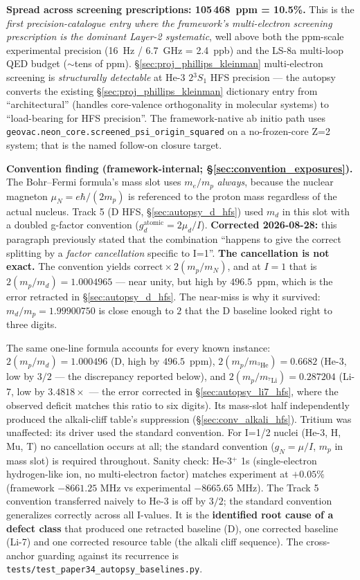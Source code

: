 \documentclass[11pt]{article}
\begin{document}
\textbf{Spread across screening prescriptions: 105\,468~ppm = 10.5\%.}
This is the \emph{first precision-catalogue entry where the framework's
multi-electron screening prescription is the dominant Layer-2
systematic}, well above both the ppm-scale experimental precision
(16~Hz / 6.7~GHz = 2.4~ppb) and the LS-8a multi-loop QED budget
($\sim$tens of ppm). \S\ref{sec:proj_phillips_kleinman} multi-electron
screening is \emph{structurally detectable} at He-3 $2{}^3\!S_1$ HFS
precision --- the autopsy converts the existing
\S\ref{sec:proj_phillips_kleinman} dictionary entry from
``architectural'' (handles core-valence orthogonality in molecular
systems) to ``load-bearing for HFS precision''. The framework-native
ab initio path uses
\texttt{geovac.neon\_core.screened\_psi\_origin\_squared} on a
no-frozen-core Z=2 system; that is the named follow-on closure target.

\textbf{Convention finding (framework-internal; \S\ref{sec:convention_exposures}).}
The Bohr--Fermi formula's mass slot uses $m_e/m_p$ \emph{always},
because the nuclear magneton $\mu_N = e\hbar/(2 m_p)$ is referenced
to the proton mass regardless of the actual nucleus. Track 5 (D HFS,
\S\ref{sec:autopsy_d_hfs}) used $m_d$ in this slot with a doubled
g-factor convention ($g_d^\text{atomic} = 2\mu_d/I$).  \textbf{Corrected
2026-08-28:} this paragraph previously stated that the combination
``happens to give the correct splitting by a \emph{factor cancellation}
specific to I=1''.  \textbf{The cancellation is not exact.}  The
convention yields $\text{correct} \times 2(m_p/m_N)$, and at $I=1$ that
is $2(m_p/m_d) = 1.0004965$ --- near unity, but high by $496.5$~ppm,
which is the error retracted in \S\ref{sec:autopsy_d_hfs}.  The near-miss
is why it survived: $m_d/m_p = 1.99900750$ is close enough to $2$ that
the D baseline looked right to three digits.

The same one-line formula accounts for every known instance:
$2(m_p/m_d) = 1.000496$ (D, high by $496.5$~ppm),
$2(m_p/m_{{}^3\!\text{He}}) = 0.6682$ (He-3, low by $3/2$ --- the
discrepancy reported below), and
$2(m_p/m_{{}^7\!\text{Li}}) = 0.287204$ (Li-7, low by $3.4818\times$ ---
the error corrected in \S\ref{sec:autopsy_li7_hfs}, where the observed
deficit matches this ratio to six digits).  Its mass-slot half
independently produced the alkali-cliff table's suppression
(\S\ref{sec:conv_alkali_hfs}).  Tritium was unaffected: its driver used
the standard convention.  For I=1/2 nuclei (He-3, H, Mu, T) no
cancellation occurs at all; the standard convention
($g_N = \mu/I$, $m_p$ in mass slot) is required throughout.
Sanity check: He-3$^+$ 1s (single-electron hydrogen-like ion, no
multi-electron factor) matches experiment at \textbf{$+0.05\%$}
(framework $-8661.25$ MHz vs experimental $-8665.65$ MHz). The Track 5
convention transferred naively to He-3 is off by $3/2$; the standard
convention generalizes correctly across all I-values.  It is the
\textbf{identified root cause of a defect class} that produced
one retracted baseline (D), one corrected baseline (Li-7) and one
corrected resource table (the alkali cliff sequence).  The cross-anchor
guarding against its recurrence is
\texttt{tests/test\_paper34\_autopsy\_baselines.py}.
\end{document}
